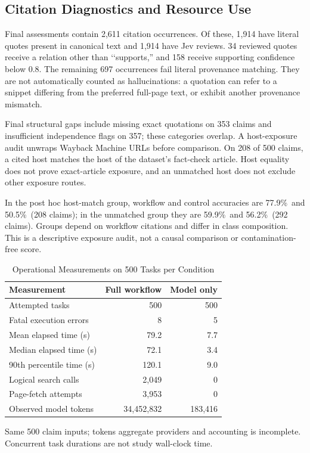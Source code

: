 \documentclass[conference]{IEEEtran}
\newcommand{\pct}{\%}
\begin{document}
\subsection{Citation Diagnostics and Resource Use}
Final assessments contain 2,611 citation occurrences. Of these, 1,914 have literal quotes present in canonical text and 1,914 have Jev reviews. 34 reviewed quotes receive a relation other than \lq\lq supports,'' and 158 receive supporting confidence below 0.8. The remaining 697 occurrences fail literal provenance matching. They are not automatically counted as hallucinations: a quotation can refer to a snippet differing from the preferred full-page text, or exhibit another provenance mismatch.

Final structural gaps include missing exact quotations on 353 claims and insufficient independence flags on 357; these categories overlap. A host-exposure audit unwraps Wayback Machine URLs before comparison. On 208 of 500 claims, a cited host matches the host of the dataset's fact-check article. Host equality does not prove exact-article exposure, and an unmatched host does not exclude other exposure routes.

In the post hoc host-match group, workflow and control accuracies are 77.9\pct\ and 50.5\pct\ (208 claims); in the unmatched group they are 59.9\pct\ and 56.2\pct\ (292 claims). Groups depend on workflow citations and differ in class composition. This is a descriptive exposure audit, not a causal comparison or contamination-free score.

\begin{table}[t]
\caption{Operational Measurements on 500 Tasks per Condition}
\label{tab:cost}
\centering
\footnotesize
\begin{tabular}{@{}lrr@{}}
\toprule
Measurement & Full workflow & Model only\\
\midrule
Attempted tasks & 500 & 500\\
Fatal execution errors & 8 & 5\\
Mean elapsed time (s) & 79.2 & 7.7\\
Median elapsed time (s) & 72.1 & 3.4\\
90th percentile time (s) & 120.1 & 9.0\\
Logical search calls & 2,049 & 0\\
Page-fetch attempts & 3,953 & 0\\
Observed model tokens & 34,452,832 & 183,416\\
\bottomrule
\end{tabular}
\par\smallskip
\parbox{\columnwidth}{\footnotesize Same 500 claim inputs; tokens aggregate providers and accounting is incomplete. Concurrent task durations are not study wall-clock time.}
\end{table}
\end{document}
